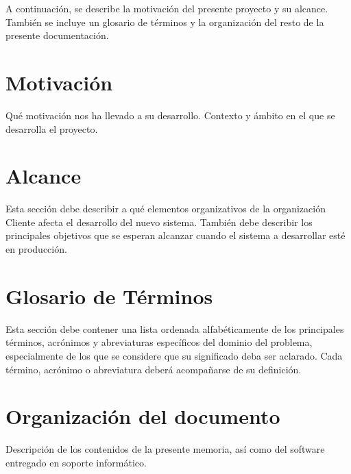 

A continuación, se describe la motivación del presente proyecto y su alcance. También se incluye un glosario de términos y la organización del resto de la presente documentación.

\section{Motivación}
Qué motivación nos ha llevado a su desarrollo. Contexto y ámbito en el que se desarrolla el proyecto.

\section{Alcance} 
Esta sección debe describir a qué elementos organizativos de la organización Cliente afecta el desarrollo del nuevo sistema. También debe describir los principales objetivos que se esperan alcanzar cuando el sistema a desarrollar esté en producción.

\section{Glosario de Términos} 
Esta sección debe contener una lista ordenada alfabéticamente de los principales términos, acrónimos y abreviaturas específicos del dominio del problema, especialmente de los que se considere que su significado deba ser aclarado. Cada término, acrónimo o abreviatura deberá acompañarse de su definición.

\section{Organización del documento}
Descripción de los contenidos de la presente memoria, así como del software entregado en soporte informático.




